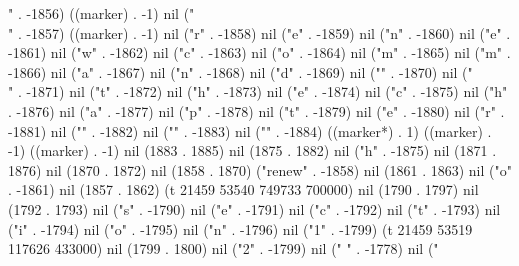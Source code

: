 " . -1856) ((marker) . -1) nil ("\\" . -1857) ((marker) . -1) nil ("r" . -1858) nil ("e" . -1859) nil ("n" . -1860) nil ("e" . -1861) nil ("w" . -1862) nil ("c" . -1863) nil ("o" . -1864) nil ("m" . -1865) nil ("m" . -1866) nil ("a" . -1867) nil ("n" . -1868) nil ("d" . -1869) nil ("{" . -1870) nil ("\\" . -1871) nil ("t" . -1872) nil ("h" . -1873) nil ("e" . -1874) nil ("c" . -1875) nil ("h" . -1876) nil ("a" . -1877) nil ("p" . -1878) nil ("t" . -1879) nil ("e" . -1880) nil ("r" . -1881) nil ("}" . -1882) nil ("{" . -1883) nil ("}" . -1884) ((marker*) . 1) ((marker) . -1) ((marker) . -1) nil (1883 . 1885) nil (1875 . 1882) nil ("h" . -1875) nil (1871 . 1876) nil (1870 . 1872) nil (1858 . 1870) ("renew" . -1858) nil (1861 . 1863) nil ("o" . -1861) nil (1857 . 1862) (t 21459 53540 749733 700000) nil (1790 . 1797) nil (1792 . 1793) nil ("s" . -1790) nil ("e" . -1791) nil ("c" . -1792) nil ("t" . -1793) nil ("i" . -1794) nil ("o" . -1795) nil ("n" . -1796) nil ("1" . -1799) (t 21459 53519 117626 433000) nil (1799 . 1800) nil ("2" . -1799) nil (" " . -1778) nil ("%